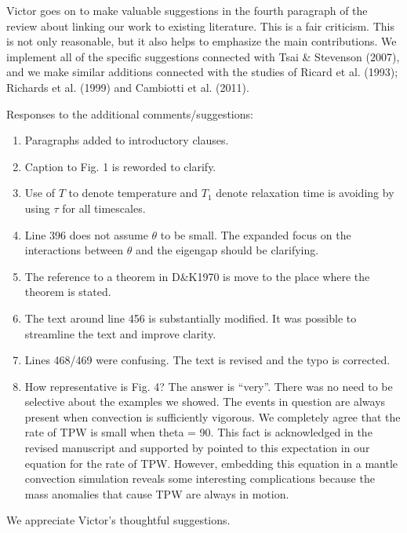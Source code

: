\documentclass[a4paper,12pt]{article}
\begin{document}
Victor goes on to make valuable suggestions in the fourth paragraph of the review about linking our work to existing literature.
This is a fair criticism.
This is not only reasonable, but it also helps to emphasize the main contributions.
We implement all of the specific suggestions connected with Tsai \& Stevenson (2007), and we make similar additions connected with the studies of 
Ricard et al. (1993); Richards et al. (1999) and Cambiotti et al. (2011).

Responses to the additional comments/suggestions:

\begin{enumerate}

\item Paragraphs added to introductory clauses.

\item Caption to Fig. 1 is reworded to clarify.

\item Use of $T$ to denote temperature and $T_1$ denote relaxation time is avoiding by using $\tau$ for all timescales.

\item Line 396 does not assume $\theta$ to be small. The expanded focus on the interactions between $\theta$ and the eigengap should be clarifying.

\item The reference to a theorem in D\&K1970 is move to the place where the theorem is stated.

\item The text around line 456 is substantially modified. It was possible to streamline the text and improve clarity.

\item Lines 468/469 were confusing. The text is revised and the typo is corrected.

\item How representative is Fig. 4? The answer is ``very''. There was no need to be selective about the examples we showed. The events in question are always present when convection is sufficiently vigorous. We completely agree that the rate of TPW is small when theta = 90. This fact is acknowledged in the revised manuscript and supported by pointed to this expectation in our equation for the rate of TPW. However, embedding this equation in a mantle convection simulation reveals some interesting complications because the mass anomalies that cause TPW are always in motion.

\end{enumerate}

We appreciate Victor's thoughtful suggestions.
\end{document}

